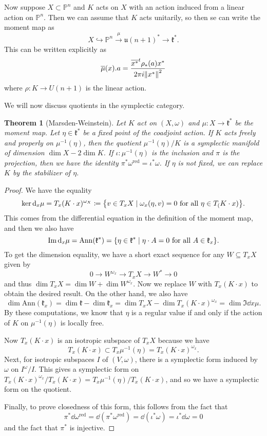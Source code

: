 \documentclass[leqno, openany]{memoir}
\newtheorem{thm}{Theorem}[section]
\theoremstyle{definition}
\theoremstyle{remark}
\theoremstyle{plain}
\theoremstyle{definition}
\theoremstyle{remark}
\renewcommand{\P}{\mathbb{P}}
\newcommand{\mf}[1]{\mathfrak{#1}}
\newcommand{\mr}[1]{\mathrm{#1}}
\newcommand{\ol}[1]{\overline{#1}}
\begin{document}
Now suppose $X \subset \P^n$ and $K$ acts on $X$ with an action induced from a
linear action on $\P^n$. Then we can assume that $K$ acts unitarily, so then se
can write the moment map as \[ X \hookrightarrow \P^n \xrightarrow{\mu}
\mf{u}(n+1)^* \to \mf{k}^*. \] This can be written explicitly as \[
\ol{\mu}(x).a = \frac{\ol{x^*}^t \rho_*(a)x^*}{2\pi i \norm{x^*}^2} \] where
$\rho \colon K \to U(n+1)$ is the linear action.


We will now discuss quotients in the symplectic category.
\begin{thm}[Marsden-Weinstein] Let $K$ act on $(X, \omega)$ and $\mu \colon X
    \to \mf{k}^*$ be the moment map. Let $\eta \in \mf{k}^*$ be a fixed point
    of the coadjoint action. If $K$ acts freely and properly on
    $\mu^{-1}(\eta)$, then the quotient $\mu^{-1}(\eta)/K$ is a symplectic
    manifold of dimension $\dim X - 2 \dim K$. If $\iota \colon \mu^{-1}(\eta)$
    is the inclusion and $\pi$ is the projection, then we have the identity
    $\pi^*\omega^{\mr{red}}  = \iota^*\omega$. If $\eta$ is not fixed, we can
    replace $K$ by the stabilizer of $\eta$.  \end{thm}

\begin{proof} We have the equality \[ \ker \dd_x{\mu} = T_x(K \cdot
x)^{\omega_X} \coloneqq \qty{v \in T_x X \mid \omega_x(\eta, v) = 0 \text{ for
all } \eta \in T_(K \cdot x)}. \] This comes from the differential equation in
the definition of the moment map, and then we also have \[ \Im \dd_x {\mu} =
\mr{Ann}(\mf{k}^*) = \qty{\eta \in \mf{k}^* \mid \eta \cdot A = 0 \text{ for
all }A \in \mf{k}_x}. \] To get the dimension equality, we have a short exact
sequence for any $W \subseteq T_x X$ given by \[ 0 \to W^{\omega_x} \to T_x X
\to W^* \to 0 \] and thus $\dim T_x X = \dim W + \dim W^{\omega_x}$. Now we
replace $W$ with $T_x(K\cdot x)$ to obtain the desired result. On the other
hand, we also have \[ \dim \mr{Ann}(\mf{k}_x) = \dim \mf{k} - \dim \mf{k}_x =
\dim T_x X - \dim T_x(K \cdot x)^{\omega_x} = \dim \Im \dd{x} \mu. \] By these
computations, we know that $\eta$ is a regular value if and only if the action
of $K$ on $\mu^{-1}(\eta)$ is locally free.

    Now $T_x(K \cdot x)$ is an isotropic subspace of $T_x X$ because we have \[
    T_x(K \cdot x) \subset T_x \mu^{-1}(\eta) = T_x(K \cdot x)^{\omega_x}. \]
    Next, for isotropic subspaces $I$ of $(V, \omega)$, there is a symplectic
    form induced by $\omega$ on $I^{\omega} / I$. This gives a symplectic form
    on $T_x(K \cdot x)^{\omega_x} / T_x(K \cdot x) = T_x \mu^{-1}(\eta) / T_x(K
    \cdot x)$, and so we have a symplectic form on the quotient.

    Finally, to prove closedness of this form, this follows from the fact that
    \[ \pi^* \dd{\omega^{\mr{red}}} = \dd{(\pi^* \omega^{\mr{red}})} =
    \dd{(\iota^* \omega)} = \iota^* \dd{\omega} = 0 \] and the fact that
$\pi^*$ is injective.  \end{proof}
\end{document}
